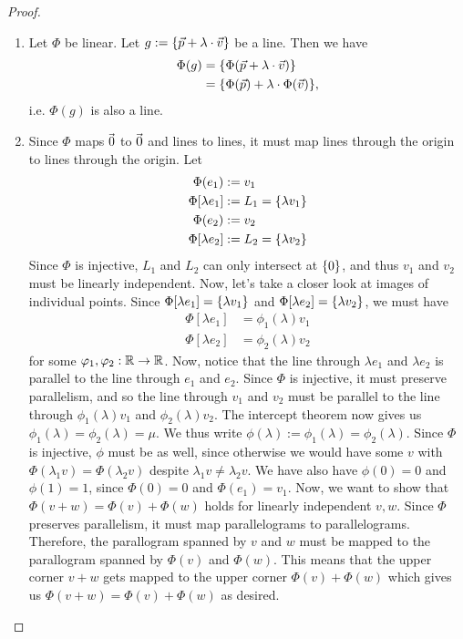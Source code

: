 \begin{proof}
	\begin{enumerate}
		\item[$\Rightarrow$]
		Let $\Phi$ be linear. Let $g := \qty{\vec{p}+ \lambda \cdot \vec{v}}$ be a line. Then we have
		\begin{align*}
			\Phi(g) 
			&= \qty{\Phi(\vec{p}+ \lambda \cdot \vec{v})}\\
			&= \qty{\Phi(\vec{p}) + \lambda \cdot \Phi(\vec{v})},
		\end{align*}
		i.e. $\Phi(g)$ is also a line.
		\item[$\Leftarrow$]
		Since $\Phi$ maps $\kern-1.2pt\vec{\kern1.2pt 0}$ to $\kern-1.2pt\vec{\kern1.2pt 0}$ and lines to lines, it must map lines through the origin to lines through the origin. Let
		\begin{align*}
			\Phi(e_1) &:= v_1\\
			\Phi[\lambda e_1] &:= L_1 = \qty{\lambda v_1}\\
			\Phi(e_2) &:= v_2\\
			\Phi[\lambda e_2] &:= L_2 = \qty{\lambda v_2}
		\end{align*}
		Since $\Phi$ is injective, $L_1$ and $L_2$ can only intersect at $\qty{0}$, and thus $v_1$ and $v_2$ must be linearly independent.
		\newpar
		Now, let's take a closer look at images of individual points.
		Since $\Phi[\lambda e_1] = \qty{\lambda v_1}$ and $\Phi[\lambda e_2] = \qty{\lambda v_2}$, we must have
		\begin{align*}
			\Phi[\lambda e_1] &= \phi_1(\lambda) v_1\\
			\Phi[\lambda e_2] &= \phi_2(\lambda) v_2
		\end{align*}
		for some $\varphi_1, \varphi_2 : \mathbb{R} \to \mathbb{R}$.
		\newpar
		Now, notice that the line through $\lambda e_1$ and $\lambda e_2$ is parallel to the line through $e_1$ and $e_2$. Since $\Phi$ is injective, it must preserve parallelism, and so the line through $v_1$ and $v_2$ must be parallel to the line through $\phi_1(\lambda)v_1$ and $\phi_2(\lambda)v_2$. The intercept theorem now gives us $\phi_1(\lambda) = \phi_2(\lambda) = \mu$. We thus write $\phi(\lambda) := \phi_1(\lambda) = \phi_2(\lambda)$.
		\newpar
		Since $\Phi$ is injective, $\phi$ must be as well, since otherwise we would have some $v$ with $\Phi(\lambda_1 v) = \Phi(\lambda_2 v)$ despite $\lambda_1 v \neq \lambda_2 v$. We have also have $\phi(0) = 0$ and $\phi(1) = 1$, since $\Phi(0) = 0$ and $\Phi(e_1) = v_1$.
		\newpar
		Now, we want to show that $\Phi(v+w) = \Phi(v) + \Phi(w)$ holds for linearly independent $v,w$. Since $\Phi$ preserves parallelism, it must map parallelograms to parallelograms. Therefore, the parallogram spanned by $v$ and $w$ must be mapped to the parallogram spanned by $\Phi(v)$ and $\Phi(w)$. This means that the upper corner $v+w$ gets mapped to the upper corner $\Phi(v) + \Phi(w)$ which gives us $\Phi(v+w) = \Phi(v) + \Phi(w)$ as desired.

\end{enumerate}
\end{proof}
